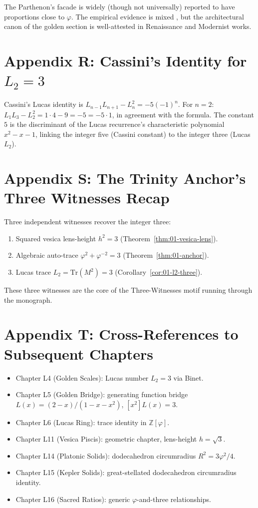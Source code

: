 The Parthenon's facade is widely (though not universally) reported to
have proportions close to $\varphi$. The empirical evidence is mixed
\cite{livio_phi}, but the architectural canon of the golden section
is well-attested in Renaissance and Modernist works.

\section*{Appendix R: Cassini's Identity for $L_2 = 3$}
\label{fa_01:sec:01-app-R}

Cassini's Lucas identity is $L_{n-1} L_{n+1} - L_n^2 = -5 (-1)^n$.
For $n = 2$: $L_1 L_3 - L_2^2 = 1 \cdot 4 - 9 = -5 = -5 \cdot 1$, in
agreement with the formula. The constant $5$ is the discriminant of
the Lucas recurrence's characteristic polynomial $x^2 - x - 1$,
linking the integer five (Cassini constant) to the integer three
(Lucas $L_2$).

\section*{Appendix S: The Trinity Anchor's Three Witnesses Recap}
\label{fa_01:sec:01-app-S}

Three independent witnesses recover the integer three:

\begin{enumerate}
  \item Squared vesica lens-height $h^2 = 3$
    (Theorem~\ref{thm:01-vesica-lens}).
  \item Algebraic auto-trace $\varphi^2 + \varphi^{-2} = 3$
    (Theorem~\ref{thm:01-anchor}).
  \item Lucas trace $L_2 = \mathrm{Tr}(M^2) = 3$
    (Corollary~\ref{cor:01-l2-three}).
\end{enumerate}

These three witnesses are the core of the Three-Witnesses motif
running through the monograph.

\section*{Appendix T: Cross-References to Subsequent Chapters}
\label{fa_01:sec:01-app-T}

\begin{itemize}
  \item Chapter L4 (Golden Scales): Lucas number $L_2 = 3$ via Binet.
  \item Chapter L5 (Golden Bridge): generating function bridge $L(x)
    = (2-x)/(1-x-x^2)$, $[x^2] L(x) = 3$.
  \item Chapter L6 (Lucas Ring): trace identity in $\mathbb{Z}[\varphi]$.
  \item Chapter L11 (Vesica Piscis): geometric chapter, lens-height
    $h = \sqrt 3$.
  \item Chapter L14 (Platonic Solids): dodecahedron circumradius
    $R^2 = 3 \varphi^2/4$.
  \item Chapter L15 (Kepler Solids): great-stellated dodecahedron
    circumradius identity.
  \item Chapter L16 (Sacred Ratios): generic $\varphi$-and-three
    relationships.
\end{itemize}

